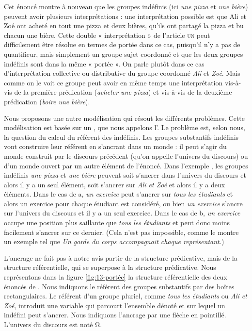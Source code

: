 {Cet énoncé montre à nouveau que les groupes indéfinis (ici \textit{une pizza} et \textit{une bière}) peuvent avoir plusieurs interprétations : une interprétation possible est que Ali et Zoé ont acheté en tout une pizza et deux bières, qu’ils ont partagé la pizza et bu chacun une bière. Cette double « interprétation » de l’article \textsc{un} peut difficilement être résolue en termes de portée dans ce cas, puisqu’il n’y a pas de quantifieur, mais simplement un groupe sujet coordonné et que les deux groupes indéfinis sont dans la même « portée ». On parle plutôt dans ce cas d’interprétation collective ou distributive du groupe coordonné \textit{Ali} et \textit{Zoé}. Mais comme on le voit ce groupe peut avoir en même temps une interprétation  vis-à-vis de la première prédication (\textit{acheter une pizza}) et  vis-à-vis de la deuxième prédication (\textit{boire une bière}).

Nous proposons une autre modélisation qui résout les différents problèmes. Cette modélisation est basée sur un , que nous appelons l’. Le problème est, selon nous, la question du calcul du référent des indéfinis. Les groupes substantifs indéfinis vont construire leur référent en s’ancrant dans un monde : il peut s’agir du monde construit par le discours précédent (qu’on appelle l’univers du discours) ou d’un monde ouvert par un autre élément de l’énoncé. Dans l’exemple , les groupes indéfinis \textit{une pizza} et \textit{une bière} peuvent soit s’ancrer dans l’univers du discours et alors il y a un seul élément, soit s’ancrer sur \textit{Ali et Zoé} et alors il y a deux éléments. Dans le cas de a, \textit{un exercice} peut s’ancrer sur \textit{tous les étudiants} et alors un exercice pour chaque étudiant est considéré, ou bien \textit{un exercice} s’ancre sur l’univers du discours et il y a un seul exercice. Dans le cas de b, \textit{un exercice} occupe une position plus saillante que \textit{tous les étudiants} et peut donc moins facilement s’ancrer sur ce dernier. (Cela n’est pas impossible, comme le montre un exemple tel que \textit{Un garde du corps accompagnait chaque représentant.}) 

L’ancrage ne fait pas à notre avis partie de la structure prédicative, mais de la structure référentielle, qui se superpose à la structure prédicative. Nous représentons dans la figure \ref{fig:13-portée} la structure référentielle des deux énoncés de . Nous indiquons le référent des groupes substantifs par des boîtes rectangulaires. Le référent d’un groupe pluriel, comme \textit{tous les étudiants} ou \textit{Ali et Zoé}, introduit une variable qui parcourt l’ensemble dénoté et sur lequel un indéfini peut s’ancrer. Nous indiquons l’ancrage par une flèche en pointillé. L’univers du discours est noté Ω.

}
